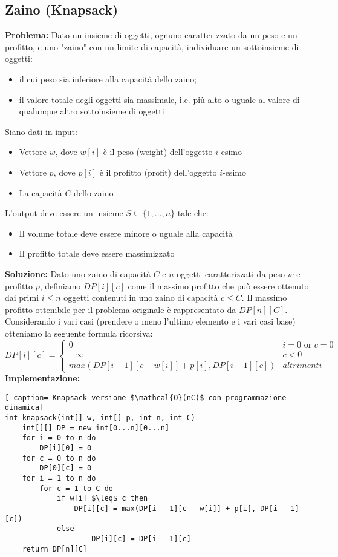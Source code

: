 \documentclass[../cheatSheetAlgoritmi.tex]{subfiles}
\begin{document}
\subsection{Zaino (Knapsack)}
\textbf{Problema:} Dato un insieme di oggetti, ognuno caratterizzato da un peso e un
profitto, e uno "zaino" con un limite di capacità, individuare un
sottoinsieme di oggetti: 
\begin{itemize}
	\item il cui peso sia inferiore alla capacità dello zaino;
	\item il valore totale degli oggetti sia massimale, i.e. più alto o uguale al valore di qualunque altro sottoinsieme di oggetti
\end{itemize} 
Siano dati in input: 
\begin{itemize}
	\item Vettore $w$, dove $w[i]$ è il peso (weight) dell’oggetto $i$-esimo
	\item Vettore $p$, dove $p[i]$ è il profitto (profit) dell’oggetto $i$-esimo
	\item La capacità $C$ dello zaino
\end{itemize} 
L'output deve essere un insieme $S  \subseteq \{1, ..., n \}$ tale che:
\begin{itemize}
	\item Il volume totale deve essere minore o uguale alla capacità 
	\item Il profitto totale deve essere massimizzato
\end{itemize} 
\textbf{Soluzione:} Dato uno zaino di capacità $C$ e $n$ oggetti caratterizzati da peso $w$ e profitto $p$, definiamo $DP[i][c]$ come il massimo profitto che può essere ottenuto dai primi $i \leq n$ oggetti contenuti in uno zaino di
capacità $c \leq C$. Il massimo profitto ottenibile per il problema originale è rappresentato da $DP[n][C]$.\\
Considerando i vari casi (prendere o meno l'ultimo elemento e i vari casi base) otteniamo la seguente formula ricorsiva: 
\begin{equation*}
  	DP[i][c] =\begin{cases}
    	0 & \text{$i = 0$  or  $c = 0$}\\
    	-\infty & \text{$c < 0$}\\
    	max(DP[i -1][c-w[i]]+p[i], DP[i-1][c]) & \text{$altrimenti$}
  	\end{cases}
\end{equation*}
\newpage
\noindent
\textbf{Implementazione:}
\begin{lstlisting}[ caption= Knapsack versione $\mathcal{O}(nC)$ con programmazione dinamica]
int knapsack(int[] w, int[] p, int n, int C)
	int[][] DP = new int[0...n][0...n]
	for i = 0 to n do
		DP[i][0] = 0
	for c = 0 to n do
		DP[0][c] = 0
	for i = 1 to n do
		for c = 1 to C do
			if w[i] $\leq$ c then
				DP[i][c] = max(DP[i - 1][c - w[i]] + p[i], DP[i - 1][c])
			else
					DP[i][c] = DP[i - 1][c]
	return DP[n][C]
\end{lstlisting}
\end{document}

